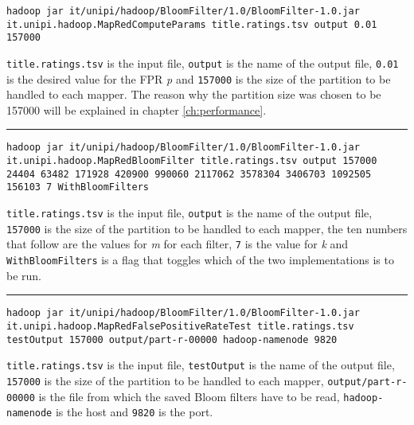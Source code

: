 \begin{lstlisting}[basicstyle=\ttfamily\footnotesize, breaklines=true, backgroundcolor = \color{lightgray}]
hadoop jar it/unipi/hadoop/BloomFilter/1.0/BloomFilter-1.0.jar it.unipi.hadoop.MapRedComputeParams title.ratings.tsv output 0.01 157000
\end{lstlisting}
\hfill \break
\texttt{title.ratings.tsv} is the input file, \texttt{output} is the name of the output file, \texttt{0.01} is the desired value for the FPR \textit{p} and \texttt{157000} is the size of the partition to be handled to each mapper. The reason why the partition size was chosen to be 157000 will be explained in chapter \ref{ch:performance}.
\vspace{5pt}
\hrule
\vspace{6pt}
\begin{lstlisting}[basicstyle=\ttfamily\footnotesize, breaklines=true, backgroundcolor = \color{lightgray}]
hadoop jar it/unipi/hadoop/BloomFilter/1.0/BloomFilter-1.0.jar it.unipi.hadoop.MapRedBloomFilter title.ratings.tsv output 157000 24404 63482 171928 420900 990060 2117062 3578304 3406703 1092505 156103 7 WithBloomFilters
\end{lstlisting}
\hfill \break
\texttt{title.ratings.tsv} is the input file, \texttt{output} is the name of the output file, \texttt{157000} is the size of the partition to be handled to each mapper, the ten numbers that follow are the values for \textit{m} for each filter, \texttt{7} is the value for \textit{k} and \texttt{WithBloomFilters} is a flag that toggles which of the two implementations is to be run.
\vspace{5pt}
\hrule
\vspace{6pt}
\begin{lstlisting}[basicstyle=\ttfamily\footnotesize, breaklines=true, backgroundcolor = \color{lightgray}]
hadoop jar it/unipi/hadoop/BloomFilter/1.0/BloomFilter-1.0.jar it.unipi.hadoop.MapRedFalsePositiveRateTest title.ratings.tsv testOutput 157000 output/part-r-00000 hadoop-namenode 9820
\end{lstlisting}
\hfill \break
\texttt{title.ratings.tsv} is the input file, \texttt{testOutput} is the name of the output file, \texttt{157000} is the size of the partition to be handled to each mapper, \texttt{output/part-r-00000} is the file from which the saved Bloom filters have to be read, \texttt{hadoop-namenode} is the host and \texttt{9820} is the port.